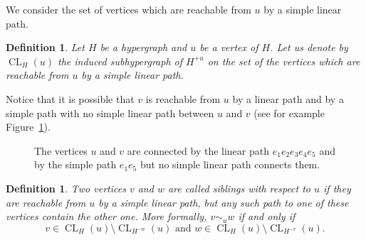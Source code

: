 \documentclass{article}
\def\rotateclockwise#1{
\newdimen\xrw
  \pgfextractx{\xrw}{#1}
  \newdimen\yrw
  \pgfextracty{\yrw}{#1}
\pgfpoint{\yrw}{-\xrw}
}
\def\rotatecounterclockwise#1{
\newdimen\xrcw
  \pgfextractx{\xrcw}{#1}
  \newdimen\yrcw
  \pgfextracty{\yrcw}{#1}
\pgfpoint{-\yrcw}{\xrcw}
}
\def\outsidespacerpgfclockwise#1#2#3{
\pgfpointscale{#3}{
    \rotateclockwise{
      \pgfpointnormalised{
        \pgfpointdiff{#1}{#2}}}}
}
\def\outsidespacerpgfcounterclockwise#1#2#3{
\pgfpointscale{#3}{
    \rotatecounterclockwise{
      \pgfpointnormalised{
        \pgfpointdiff{#1}{#2}}}}
}
\def\outsidepgfclockwise#1#2#3{
\pgfpointadd{#2}{\outsidespacerpgfclockwise{#1}{#2}{#3}}
}
\def\outsidepgfcounterclockwise#1#2#3{
\pgfpointadd{#2}{\outsidespacerpgfcounterclockwise{#1}{#2}{#3}}
}
\def\outside#1#2#3{
  ($ (#2) ! #3 ! -90 : (#1) $)
}
\def\cornerpgf#1#2#3#4{
\pgfextra{
    \pgfmathanglebetweenpoints{#2}{\outsidepgfcounterclockwise{#1}{#2}{#4}}
    \let\anglea\pgfmathresult
    \let\startangle\pgfmathresult

    \pgfmathanglebetweenpoints{#2}{\outsidepgfclockwise{#3}{#2}{#4}}
    \pgfmathparse{\pgfmathresult - \anglea}
    \pgfmathroundto{\pgfmathresult}
    \let\arcangle\pgfmathresult
    \ifthenelse{180=\arcangle \or 180<\arcangle}{
      \pgfmathparse{-360 + \arcangle}}{
      \pgfmathparse{\arcangle}}
    \let\deltaangle\pgfmathresult

    \newdimen\x
    \pgfextractx{\x}{\outsidepgfcounterclockwise{#1}{#2}{#4}}
    \newdimen\y
    \pgfextracty{\y}{\outsidepgfcounterclockwise{#1}{#2}{#4}}
  }
  -- (\x,\y) arc [start angle=\startangle, delta angle=\deltaangle, radius=#4]
}
\def\corner#1#2#3#4{
  \cornerpgf{\pgfpointanchor{#1}{center}}{\pgfpointanchor{#2}{center}}{\pgfpointanchor{#3}{center}}{#4}
}
\def\hedgeiii#1#2#3#4{
\outside{#1}{#2}{#4} \corner{#1}{#2}{#3}{#4} \corner{#2}{#3}{#1}{#4} \corner{#3}{#1}{#2}{#4} -- cycle
}
\DeclareMathOperator{\CL}{CL}
\newtheorem{definition}[theorem]{Definition}
\begin{document}
We consider the set of vertices which are reachable from \(u\) by a simple linear path.
\begin{definition}
	Let \(H\) be a hypergraph and \(u\) be a vertex of \(H\). Let us denote by \(\CL_H(u)\) the induced subhypergraph of \(H^{+u}\) on the set of the vertices which are reachable from \(u\) by a simple linear path.
\end{definition}

Notice that it is possible that \(v\) is reachable from \(u\) by a linear path and by a simple path with no simple linear path between \(u\) and \(v\) (see for example Figure~\ref{fig:linear_path}).



\begin{figure}
    \centering



    \caption{The vertices $u$ and $v$ are connected by the linear path $e_1e_2e_3e_4e_5$ and by the simple path $e_1e_5$ but no simple linear path connects them.}
    \label{fig:linear_path}
\end{figure}

 
\begin{definition}
	Two vertices \(v\) and \(w\) are called {\em siblings} with respect to \(u\) if they are reachable from \(u\) by a simple linear path, but any such path to one of these vertices contain the other one. More formally, \(v \sim_u w\) if and only if \[
		v \in \CL_H(u)\setminus \CL_{H^{-w}}(u) \text{ and }w \in \CL_H(u)\setminus \CL_{H^{-v}}(u) .
	\]
\end{definition}
\end{document}
